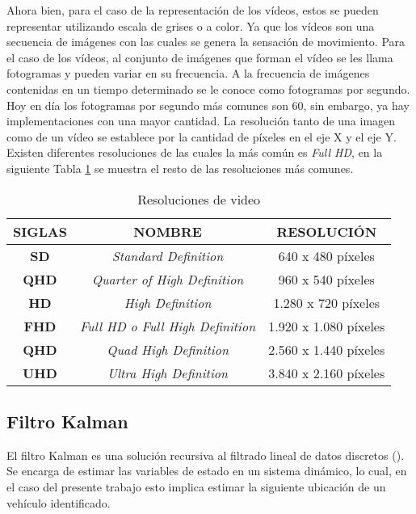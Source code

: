 Ahora bien, para el caso de la representación de los vídeos, estos se pueden representar utilizando escala de grises o a color. Ya que los vídeos son una secuencia de imágenes con las cuales se genera la sensación de movimiento. Para el caso de los vídeos, al conjunto de imágenes que forman el vídeo se les llama fotogramas y pueden variar en su frecuencia. A la frecuencia de imágenes contenidas en un tiempo determinado se le conoce como fotogramas por segundo. Hoy en día los fotogramas por segundo más comunes son 60, sin embargo, ya hay implementaciones con una mayor cantidad.
La resolución tanto de una imagen como de un vídeo se establece por la cantidad de píxeles en el eje X y el eje Y. Existen diferentes resoluciones de las cuales la más común es \textit{Full HD}, en la siguiente Tabla \ref{tab:resolutions} se muestra el resto de las resoluciones más comunes.

\begin{table}[H]
    \caption{Resoluciones de video}
    \centering
    \label{tab:resolutions}
    \begin{tabular}{|c|c|c|}
    \hline
    \textbf{SIGLAS} & \textbf{NOMBRE} & \textbf{RESOLUCIÓN} \\ \hline
    \textbf{SD}     & \textit{Standard Definition} & 640 x 480 píxeles \\ \hline
    \textbf{QHD}    & \textit{Quarter of High Definition} & 960 x 540 píxeles \\ \hline
    \textbf{HD}     & \textit{High Definition} & 1.280 x 720 píxeles \\ \hline
    \textbf{FHD}    & \textit{Full HD o Full High Definition} & 1.920 x 1.080 píxeles \\ \hline
    \textbf{QHD}    & \textit{Quad High Definition} & 2.560 x 1.440 píxeles \\ \hline
    \textbf{UHD}    & \textit{Ultra High Definition} & 3.840 x 2.160 píxeles \\ \hline
    \end{tabular}
\end{table}

\subsection{Filtro Kalman}

El filtro Kalman es una solución recursiva al filtrado lineal de datos discretos (\cite{welch1995introduction}). Se encarga de estimar las variables de estado en un sistema dinámico, lo cual, en el caso del presente trabajo esto implica estimar la siguiente ubicación de un vehículo identificado.

